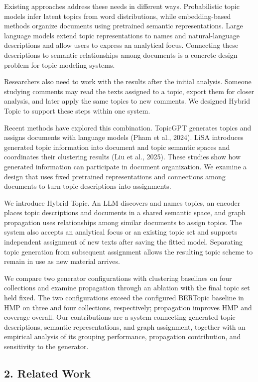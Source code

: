 \documentclass[
  11pt,
  a4paper,
]{article}
\begin{document}
Existing approaches address these needs in different ways. Probabilistic
topic models infer latent topics from word distributions, while
embedding-based methods organize documents using pretrained semantic
representations. Large language models extend topic representations to
names and natural-language descriptions and allow users to express an
analytical focus. Connecting these descriptions to semantic
relationships among documents is a concrete design problem for topic
modeling systems.

Researchers also need to work with the results after the initial
analysis. Someone studying comments may read the texts assigned to a
topic, export them for closer analysis, and later apply the same topics
to new comments. We designed Hybrid Topic to support these steps within
one system.

Recent methods have explored this combination. TopicGPT generates topics
and assigns documents with language models (Pham et al., 2024). LiSA
introduces generated topic information into document and topic semantic
spaces and coordinates their clustering results (Liu et al., 2025).
These studies show how generated information can participate in document
organization. We examine a design that uses fixed pretrained
representations and connections among documents to turn topic
descriptions into assignments.

We introduce Hybrid Topic. An LLM discovers and names topics, an encoder
places topic descriptions and documents in a shared semantic space, and
graph propagation uses relationships among similar documents to assign
topics. The system also accepts an analytical focus or an existing topic
set and supports independent assignment of new texts after saving the
fitted model. Separating topic generation from subsequent assignment
allows the resulting topic scheme to remain in use as new material
arrives.

We compare two generator configurations with clustering baselines on
four collections and examine propagation through an ablation with the
final topic set held fixed. The two configurations exceed the configured
BERTopic baseline in HMP on three and four collections, respectively;
propagation improves HMP and coverage overall. Our contributions are a
system connecting generated topic descriptions, semantic
representations, and graph assignment, together with an empirical
analysis of its grouping performance, propagation contribution, and
sensitivity to the generator.

\subsection{2. Related Work}\label{related-work}
\end{document}
